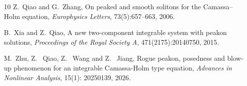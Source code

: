 \documentclass[11pt]{article}
\begin{document}
\begin{thebibliography}{10}
Z.~Qiao and G.~Zhang,
\newblock On peaked and smooth solitons for the Camassa--Holm equation,
\newblock \emph{Europhysics Letters}, 73(5):657--663, 2006.

B.~Xia and Z.~Qiao,
\newblock A new two-component integrable system with peakon solutions,
\newblock \emph{Proceedings of the Royal Society A}, 471(2175):20140750, 2015.

M.~Zhu, Z. ~Qiao, Z. ~Wang and Z. ~Jiang,
\newblock Rogue peakon, posedness and blow-up phenomenon for an integrable Camassa-Holm type equation,
\newblock \emph{Advances in Nonlinear Analysis}, 15(1): 20250139, 2026.

\end{thebibliography}
\end{document}

